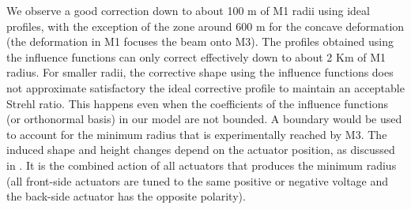 \documentclass{iucr}
\newcommand{\inblue}[1]{{\color{black}#1}}
\newcommand{\ingreen}[1]{{\color{green}#1}}
\begin{document}


\inblue{We observe a good correction down to about 100 m of M1 radii using ideal profiles, with the exception of the zone around 600 m for the concave deformation (the deformation in M1 focuses the beam onto M3). The profiles obtained using the influence functions can only correct effectively down to about 2 Km of M1 radius. For smaller radii, the corrective shape using the influence functions does not approximate satisfactory the ideal corrective profile to maintain an acceptable Strehl ratio. This happens even when the coefficients of the influence functions (or orthonormal basis) in our model are not bounded. A boundary would be used to account for the minimum radius that is experimentally reached by M3. The induced shape and height changes depend on the actuator position, as discussed in \cite{Ichii2019}. It is the combined action of all actuators that produces the minimum radius (all front-side actuators are tuned to the same positive or negative voltage and the back-side actuator has the opposite polarity).}





 
\end{document}
